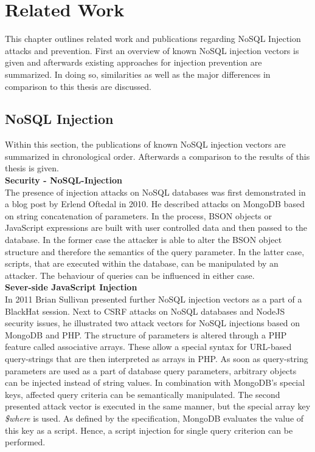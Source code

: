 \chapter{Related Work}
This chapter outlines related work and publications regarding NoSQL Injection attacks and prevention. First an overview of known NoSQL injection vectors is given and afterwards existing approaches for injection prevention are summarized. In doing so, similarities as well as the major differences in comparison to this thesis are discussed.

\section{NoSQL Injection}
Within this section, the publications of known NoSQL injection vectors are summarized in chronological order. Afterwards a comparison to the results of this thesis is given. \\

\textbf{Security - NoSQL-Injection}\cite{Oftedal:2010} \\
The presence of injection attacks on NoSQL databases was first demonstrated in a blog post by Erlend Oftedal in 2010. He described attacks on MongoDB based on string concatenation of parameters. In the process, BSON objects or JavaScript expressions are built with user controlled data and then passed to the database. In the former case the attacker is able to alter the BSON object structure and therefore the semantics of the query parameter. In the latter case, scripts, that are executed within the database, can be manipulated by an attacker. The behaviour of queries can be influenced in either case. \\

\textbf{Sever-side JavaScript Injection}\cite{Sullivan:2011} \\
In 2011 Brian Sullivan presented further NoSQL injection vectors as a part of a BlackHat session. Next to CSRF attacks on NoSQL databases and NodeJS security issues, he illustrated two attack vectors for NoSQL injections based on MongoDB and PHP. The structure of parameters is altered through a PHP feature called associative arrays. These allow a special syntax for URL-based query-strings that are then interpreted as arrays in PHP. As soon as query-string parameters are used as a part of database query parameters, arbitrary objects can be injected instead of string values. In combination with MongoDB's special keys, affected query criteria can be semantically manipulated. The second presented attack vector is executed in the same manner, but the special array key \textit{\$where} is used. As defined by the specification, MongoDB evaluates the value of this key as a script. Hence, a script injection for single query criterion can be performed. \\

